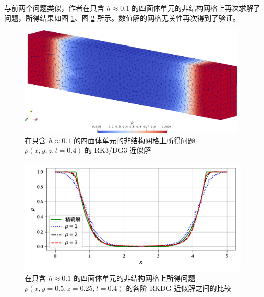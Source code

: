\newpage{}

与前两个问题类似，作者在只含 $h\approx0.1$ 的四面体单元的非结构网格上再次求解了问题，所得结果如图
\ref{fig:vacuum_tetra}、图 \ref{fig:vacuum_tetra_p_vary} 所示。数值解的网格无关性再次得到了验证。

\begin{figure}[h!]
\begin{centering}
\includegraphics[width=0.98\textwidth]{../mdpi/figures/shock_tubes/vacuum/contour_tetra}
\par\end{centering}
\caption{\label{fig:vacuum_tetra}在只含 $h\approx0.1$ 的四面体单元的非结构网格上所得问题
$\rho(x,y,z,t=0.4)$ 的 RK3/DG3 近似解}
\end{figure}

\begin{figure}[h!]
\begin{centering}
\includegraphics[width=1\textwidth,height=0.3\textheight,keepaspectratio]{figures/shock_tubes/vacuum/result_tetra}
\par\end{centering}
\caption{\label{fig:vacuum_tetra_p_vary}在只含 $h\approx0.1$ 的四面体单元的非结构网格上所得问题
$\rho(x,y=0.5,z=0.25,t=0.4)$ 的各阶 RKDG 近似解之间的比较}
\end{figure}


